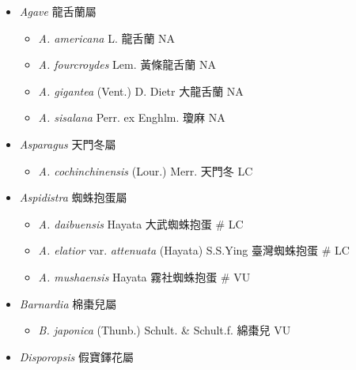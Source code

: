 
  \begin{itemize}
 \item[] \textit{Agave} 龍舌蘭屬
                                
  \begin{itemize}
        \item[] \textit{A. americana} L.  龍舌蘭   NA
        \item[] \textit{A. fourcroydes} Lem.  黃條龍舌蘭   NA
        \item[] \textit{A. gigantea} (Vent.) D. Dietr  大龍舌蘭   NA
        \item[] \textit{A. sisalana} Perr. ex Enghlm.  瓊麻   NA
  \end{itemize}
 \item[] \textit{Asparagus} 天門冬屬
                                
  \begin{itemize}
        \item[] \textit{A. cochinchinensis} (Lour.) Merr.  天門冬   LC
  \end{itemize}
 \item[] \textit{Aspidistra} 蜘蛛抱蛋屬
                                
  \begin{itemize}
        \item[] \textit{A. daibuensis} Hayata  大武蜘蛛抱蛋  \# LC
        \item[] \textit{A. elatior} var. \textit{attenuata} (Hayata) S.S.Ying  臺灣蜘蛛抱蛋  \# LC
        \item[] \textit{A. mushaensis} Hayata  霧社蜘蛛抱蛋  \# VU
  \end{itemize}
 \item[] \textit{Barnardia} 棉棗兒屬
                                
  \begin{itemize}
        \item[] \textit{B. japonica} (Thunb.) Schult. \& Schult.f.  綿棗兒   VU
  \end{itemize}
 \item[] \textit{Disporopsis} 假寶鐸花屬
                                

\end{itemize}
